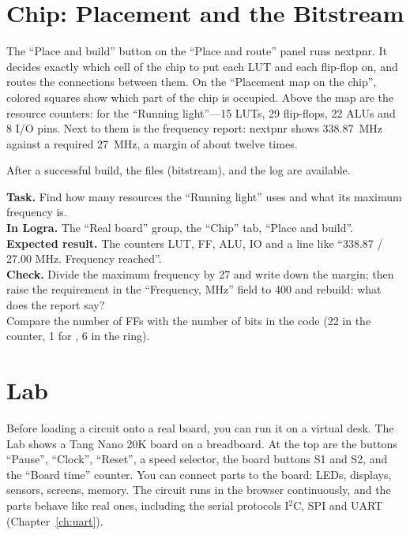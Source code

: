 \section{Chip: Placement and the Bitstream}

The ``Place and build'' button on the ``Place and route'' panel runs
nextpnr. It decides exactly which cell of the chip to put each LUT and
each flip-flop on, and routes the connections between them. On the ``Placement map on
the chip'', colored squares show which part of the chip is occupied. Above the map are
the resource counters: for the ``Running light''---15 LUTs, 29 flip-flops, 22 ALUs and 8 I/O
pins. Next to them is the frequency report: nextpnr shows 338.87~MHz
against a required 27~MHz, a margin of about twelve times.


After a successful build, the  files (bitstream),  and the log are available.

\begin{diybox}
\textbf{Task.} Find how many resources the ``Running light'' uses and what its
maximum frequency is.\\
\textbf{In Logra.} The ``Real board'' group, the ``Chip'' tab, ``Place and
build''.\\
\textbf{Expected result.} The counters LUT, FF, ALU, IO and a line like
``338.87 / 27.00 MHz. Frequency reached''.\\
\textbf{Check.} Divide the maximum frequency by 27 and write down the margin;
then raise the requirement in the ``Frequency, MHz'' field to 400 and rebuild: what does the report
say?\\
 Compare the number of FFs with the number of bits in the code (22 in the counter, 1 for
, 6 in the ring).
\end{diybox}

\section{Lab}

Before loading a circuit onto a real board, you can run it on a
virtual desk. The Lab shows a Tang Nano 20K board on a breadboard.
At the top are the buttons ``Pause'', ``Clock'', ``Reset'', a speed selector, the board buttons
S1 and S2, and the ``Board time'' counter. You can connect parts to the board:
LEDs, displays, sensors, screens, memory. The circuit runs in the browser
continuously, and the parts behave like real ones, including the serial
protocols I$^2$C, SPI and UART (Chapter~\ref{ch:uart}).

